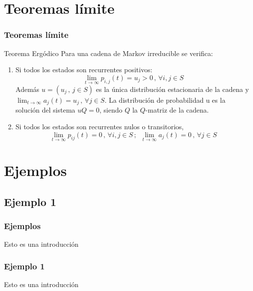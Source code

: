 \documentclass{beamer}
\begin{document}
\section{Teoremas límite}
\begin{frame}
    \frametitle{Teoremas límite}
    \begin{block}{Teorema Ergódico}
    Para una cadena de Markov irreducible se verifica:
	\begin{enumerate}
    \item Si todos los estados son recurrentes positivos:
$$\lim_{t\rightarrow\infty}p_{i,j}(t)=u_j>0 \, , \, \forall i,j\in S$$
Además $u=(u_j \, , \, j\in S)$ es la única distribución estacionaria de la cadena y $\displaystyle\lim_{t\rightarrow\infty}a_j (t)=u_j \, , \, \forall j\in S$. La distribución de probabilidad u es la solución del sistema $uQ=0$, siendo $Q$ la $Q$-matriz de la cadena.
\item Si todos los estados son recurrentes nulos o transitorios,
$$\lim_{t\rightarrow\infty}p_{ij}(t)=0\, , \, \forall i,j \in S\, ;\,\,\, \lim_{t\rightarrow\infty}a_j (t)=0\, , \, \forall j\in S$$
\end{enumerate}
    \end{block}
\end{frame}

\section{Ejemplos}
\subsection{Ejemplo 1}
\begin{frame}
    \frametitle{Ejemplos}
    Esto es una introducción
\end{frame}
\begin{frame}
    \frametitle{Ejemplo 1}
    Esto es una introducción
\end{frame}
\end{document}
